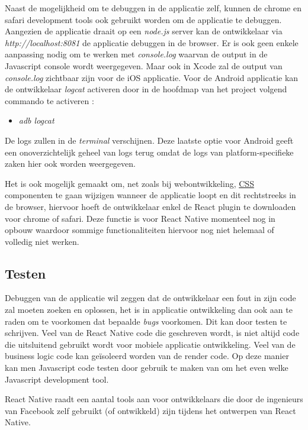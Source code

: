 Naast de mogelijkheid om te debuggen in de applicatie zelf, kunnen de chrome en safari development tools ook gebruikt worden om de applicatie te debuggen. Aangezien de applicatie draait op een \emph{node.js} server kan de ontwikkelaar via \emph{http://localhost:8081} de applicatie debuggen in de browser. Er is ook geen enkele aanpassing nodig om te werken met \emph{console.log} waarvan de output in de Javascript console wordt weergegeven. Maar ook in Xcode zal de output van \emph{console.log} zichtbaar zijn voor de iOS applicatie. Voor de Android applicatie kan de ontwikkelaar \emph{logcat} activeren door in de hoofdmap van het project volgend commando te activeren : 
\begin{itemize}
	\item [] \emph{adb logcat}
\end{itemize}
De logs zullen in de \emph{terminal} verschijnen. Deze laatste optie voor Android geeft een onoverzichtelijk geheel van logs terug omdat de logs van platform-specifieke zaken hier ook worden weergegeven. \citep{eisenman:react}

Het is ook mogelijk gemaakt om, net zoals bij webontwikkeling, \hyperref[css]{CSS} componenten te gaan wijzigen wanneer de applicatie loopt en dit rechtstreeks in de browser, hiervoor hoeft de ontwikkelaar enkel de React plugin te downloaden voor chrome of safari. Deze functie is voor React Native momenteel nog in opbouw waardoor sommige functionaliteiten hiervoor nog niet helemaal of volledig niet werken.

\subsection{Testen}    			
Debuggen van de applicatie wil zeggen dat de ontwikkelaar een fout in zijn code zal moeten zoeken en oplossen, het is in applicatie ontwikkeling dan ook aan te raden om te voorkomen dat bepaalde \emph{bugs} voorkomen. Dit kan door testen te schrijven. Veel van de React Native code die geschreven wordt, is niet altijd code die uitsluitend gebruikt wordt voor mobiele applicatie ontwikkeling. Veel van de business logic code kan geïsoleerd worden van de render code. Op deze manier kan men Javascript code testen door gebruik te maken van om het even welke Javascript development tool.

React Native raadt een aantal tools aan voor ontwikkelaars die door de ingenieurs van Facebook zelf gebruikt (of ontwikkeld) zijn tijdens het ontwerpen van React Native. 

